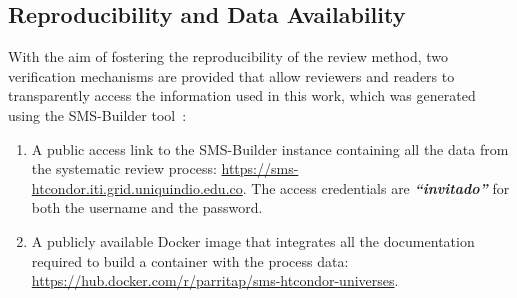 \subsection{Reproducibility and Data Availability}
\label{sec:reproducibilidad}

With the aim of fostering the reproducibility of the review method, two verification mechanisms are provided that allow reviewers and readers to transparently access the information used in this work, which was generated using the SMS-Builder tool~\cite{sms-builder-repo}: \\

\begin{enumerate}
	\item A public access link to the SMS-Builder instance containing all the data from the systematic review process: \url{https://sms-htcondor.iti.grid.uniquindio.edu.co}. The access credentials are \hbox{\textbf{\textit{``invitado''}}} for both the username and the password.
	\item A publicly available Docker image that integrates all the documentation required to build a container with the process data: \url{https://hub.docker.com/r/parritap/sms-htcondor-universes}.
\end{enumerate}
